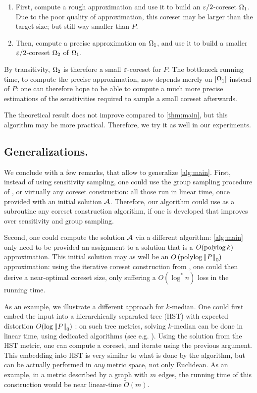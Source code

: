 \begin{enumerate}
\item First, compute a rough approximation and use it to build an $\varepsilon/2$-coreset $\Omega_1$. Due to the poor quality of approximation, this coreset may be larger than the target size; but still way smaller than $P$.
\item  Then, compute a precise approximation on $\Omega_1$, and use it to build a smaller $\varepsilon/2$-coreset $\Omega_2$ of $\Omega_1$. 
\end{enumerate}
By transitivity, $\Omega_2$ is therefore a small $\varepsilon$-coreset for $P$. The bottleneck running time, to compute the precise approximation, now depends merely on $|\Omega_1|$ instead of $P$: one can therefore hope to be able to compute a much more precise estimations of the sensitivities required to sample a small coreset afterwards.

The theoretical result does not improve compared to \cref{thm:main}, but this algorithm may be more practical. Therefore, we try it as well in our experiments.


\subsection{Generalizations.} 
We conclude with a few remarks, that allow to generalize \cref{alg:main}.
First, instead of using sensitivity sampling, one could use the group sampling procedure of \cite{stoc21}, or virtually any coreset construction: all those run in linear time, once provided with an initial solution $\mathcal A$. 
Therefore, our algorithm could use as a subroutine any coreset construction algorithm, if one is developed that improves over sensitivity and group sampling.

Second, one could compute the solution $\mathcal A$ via a different algorithm: \cref{alg:main} only need to be provided an assignment to a solution that is a $O(\operatorname{polylog} k)$ approximation. 
This initial solution may as well be an $O\left(\operatorname{polylog} \left\| P \right\|_0 \right)$ approximation: using the iterative coreset construction from \cite{BravermanJKW21}, one could then derive a near-optimal coreset size, only suffering a $O(\log^* n)$ loss in the running time.

As an example, we illustrate a different approach for $k$-median. One could first embed the input into a hierarchically separated tree (HST) with expected distortion $O(\log \left\| P \right\|_0)$ \cite{FakcharoenpholRT03}: on such tree metrics, solving $k$-median can be done in linear time, using dedicated algorithms (see e.g. \cite{Cohen-AddadLNSS21}). Using the solution from the HST metric, one can compute a coreset, and iterate using the previous argument.
This embedding into HST is very similar to what is done by the \fkmeans algorithm, but can be actually performed in \emph{any} metric space, not only Euclidean. 
As an example, in a metric described by a graph with $m$ edges, the running time of this construction would be near linear-time $\tilde O(m)$.
